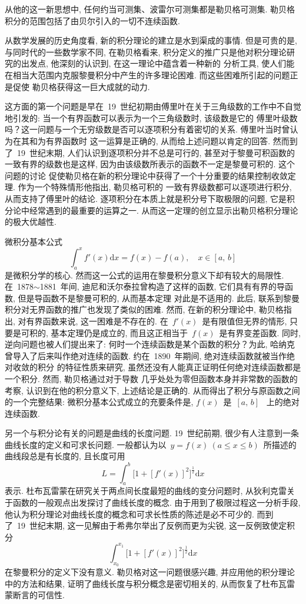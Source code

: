 从他的这一新思想中, 任何约当可测集、波雷尔可测集都是勒贝格可测集. 勒贝格积分的范围包括了由贝尔引入的一切不连续函数.

从数学发展的历史角度看, 新的积分理论的建立是水到渠成的事情. 但是可贵的是, 与同时代的一些数学家不同, 在勒贝格看来, 积分定义的推广只是他对积分理论研究的出发点, 他深刻的认识到, 在这一理论中蕴含着一种新的
分析工具, 使人们能在相当大范围内克服黎曼积分中产生的许多理论困难. 而这些困难所引起的问题正是促使
勒贝格获得这一巨大成就的动力.

这方面的第一个问题是早在~19~世纪初期由傅里叶在关于三角级数的工作中不自觉地引发的: 当一个有界函数可以表示为一个三角级数时, 该级数是它的
傅里叶级数吗？这一问题与一个无穷级数是否可以逐项积分有着密切的关系. 傅里叶当时曾认为在其和为有界函数时
这一运算是正确的, 从而给上述问题以肯定的回答. 然而到了~19~世纪末期, 人们认识到逐项积分并不总是可行的, 甚至对于黎曼可积函数的一致有界的级数也是这样, 因为由该级数所表示的函数不一定是黎曼可积的. 这个问题的讨论
促使勒贝格在新的积分理论中获得了一个十分重要的结果\raisebox{0.5mm}{-----}控制收敛定理. 作为一个特殊情形他指出, 勒贝格可积的
一致有界级数都可以逐项进行积分, 从而支持了傅里叶的结论. 逐项积分在本质上就是积分号下取极限的问题, 它是积分论中经常遇到的最重要的运算之一. 从而这一定理的创立显示出勒贝格积分理论的极大优越性.

微积分基本公式
\[
\int_a^x f'(x) \mathrm{d} x = f(x)-f(a), \quad x \in [a,\,b]
\]
是微积分学的核心. 然而这一公式的运用在黎曼积分意义下却有较大的局限性. 在~1878$\sim$1881~年间, 迪尼和沃尔泰拉曾构造了这样的函数, 它们具有有界的导函数, 但是导函数不是黎曼可积的, 从而基本定理
对此是不适用的. 此后, 联系到黎曼积分对无界函数的推广也发现了类似的困难. 然而, 在新的积分理论中, 勒贝格指出, 对有界函数来说, 这一困难是不存在的. 在~$f'(x)$~是有限值但无界的情形, 只要是可积的, 基本定理仍是成立的, 而且这正相当于~$f(x)$~是有界变差函数. 同时, 逆向问题也被人们提出来了:
何时一个连续函数是某个函数的积分？为此, 哈纳克曾导入了后来叫作绝对连续的函数. 约在~1890~年期间, 绝对连续函数就被当作绝对收敛的积分
的特征性质来研究, 虽然还没有人能真正证明任何绝对连续函数都是一个积分. 然而, 勒贝格通过对于导数
几乎处处为零但函数本身并非常数的函数的考察, 认识到在他的积分意义下, 上述结论是正确的. 从而得出了积分与原函数之间的一个完整结果: 微积分基本公式成立的充要条件是, $f(x)$~是~$[a,\,b]$~
上的绝对连续函数.

另一个与积分论有关的问题是曲线的长度问题. 19~世纪前期, 很少有人注意到一条曲线长度的定义和可求长问题. 一般都认为以~$y=f(x)~(a \leqslant x \leqslant b)$~所描述的曲线段总是有长度的, 且长度可用
\[
L=\int_a^b \big[ 1+[f'(x)]^2 \big]^\frac{1}{2} \mathrm{d} x
\]
表示. 杜布瓦雷蒙在研究关于两点间长度最短的曲线的变分问题时, 从狄利克雷关于函数的一般观点出发探讨了曲线长度的概念. 由于用到了极限过程这一分析手段, 他认为积分理论对曲线长度的概念和可求长性质的陈述是必不可少的. 而到了~19~世纪末期, 这一见解由于希弗尔举出了反例而更为尖锐, 这一反例致使定积分
\[
\int_{x_0}^{x_1} \big[ 1+[f'(x)]^2 \big]^\frac{1}{2} \mathrm{d} x
\]
在黎曼积分的定义下没有意义. 勒贝格对这一问题很感兴趣, 并应用他的积分理论中的方法和结果, 证明了曲线长度与积分概念是密切相关的, 从而恢复了杜布瓦雷蒙断言的可信性.

